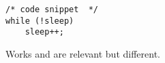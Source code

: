 \documentclass[10pt,twocolumn,a4paper]{article}
\begin{document}
\begin{lstlisting}
/* code snippet  */
while (!sleep)
	sleep++;
\end{lstlisting}

Works \cite{xen03virtualization} and \cite{pratt2005xaa} are relevant but
different.




\end{document}
